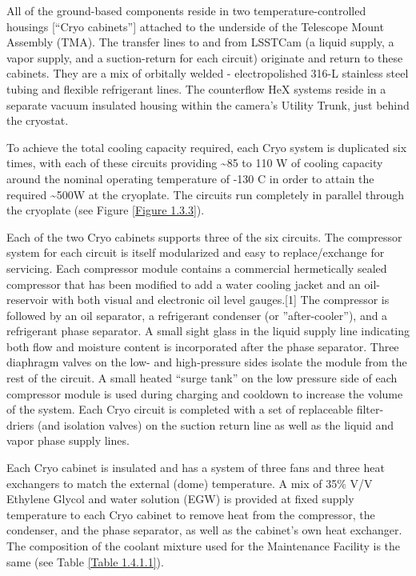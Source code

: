 All of the ground-based components reside in two temperature-controlled housings {[}``Cryo cabinets''{]} attached to the underside of the Telescope Mount Assembly (TMA). The transfer lines to and from LSSTCam (a liquid supply, a vapor supply, and a suction-return for each circuit) originate and return to these cabinets. They are a mix of orbitally welded - electropolished 316-L stainless steel tubing and flexible refrigerant lines. The counterflow HeX systems reside in a separate vacuum insulated housing within the camera's Utility Trunk, just behind the cryostat.

To achieve the total cooling capacity required, each Cryo system is duplicated six times, with each of these circuits providing \textasciitilde85 to 110 W of cooling capacity around the nominal operating temperature of -130 C in order to attain the required \textasciitilde500W at the cryoplate. The circuits run completely in parallel through the cryoplate (see Figure \ref{Figure 1.3.3}).

Each of the two Cryo cabinets supports three of the six circuits. The compressor system for each circuit is itself modularized and easy to replace/exchange for servicing. Each compressor module contains a commercial hermetically sealed compressor that has been modified to add a water cooling jacket and an oil-reservoir with both visual and electronic oil level gauges.{[}1{]} The compressor is followed by an oil separator, a refrigerant condenser (or ''after-cooler''), and a refrigerant phase separator. A small sight glass in the liquid supply line indicating both flow and moisture content is incorporated after the phase separator. Three diaphragm valves on the low- and high-pressure sides isolate the module from the rest of the circuit. A small heated ``surge tank'' on the low pressure side of each compressor module is used during charging and cooldown to increase the volume of the system. Each Cryo circuit is completed with a set of replaceable filter-driers (and isolation valves) on the suction return line as well as the liquid and vapor phase supply lines.

Each Cryo cabinet is insulated and has a system of three fans and three heat exchangers to match the external (dome) temperature. A mix of 35\% V/V Ethylene Glycol and water solution (EGW) is provided at fixed supply temperature to each Cryo cabinet to remove heat from the compressor, the condenser, and the phase separator, as well as the cabinet's own heat exchanger. The composition of the coolant mixture used for the Maintenance Facility is the same (see Table \ref{Table 1.4.1.1}).

